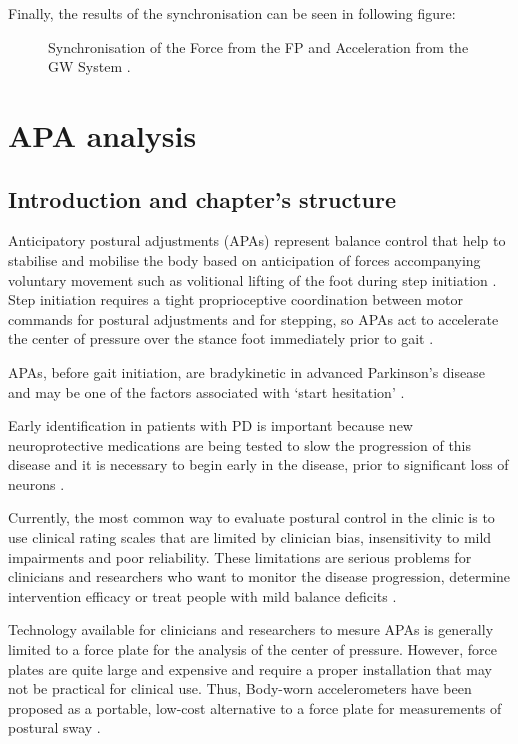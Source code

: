 Finally, the results of the synchronisation can be seen in following figure:

\begin{figure}[H]
	\centering
	\caption{Synchronisation of the Force from the FP and Acceleration from the GW System .}
	\label{fig:sinchronisedSignals}
\end{figure}


\section{APA analysis}
\subsection{Introduction and chapter's structure}

Anticipatory postural adjustments (APAs) represent balance control that help to stabilise and mobilise the body based on anticipation of forces accompanying voluntary movement such as volitional lifting of the foot during step initiation \cite{Mancini2010}. Step initiation requires a tight proprioceptive coordination between motor commands for postural adjustments and for stepping, so APAs act to accelerate the center of pressure over the stance foot immediately prior to gait \cite{Mancini2009}.

APAs, before gait initiation, are bradykinetic in advanced Parkinson’s disease and may be one of the factors associated with ‘start hesitation’ \cite{Mancini2009}.

Early identification in patients with PD is important because new neuroprotective medications are being tested to slow the progression of this disease and it is necessary to begin early in the disease, prior to significant loss of neurons \cite{Mancini2012}. 

Currently, the most common way to evaluate postural control in the clinic is to use clinical rating scales that are limited by clinician bias, insensitivity to mild impairments and poor reliability. These limitations are serious problems for clinicians and researchers who want to monitor the disease progression, determine intervention efficacy or treat people with mild balance deficits \cite{Mancini2012} .

Technology available for clinicians and researchers to mesure APAs is generally limited to a force plate for the analysis of the center of pressure. However, force plates are quite large and expensive and require a proper installation that may not be practical for clinical use. Thus, Body-worn accelerometers have been proposed as a portable, low-cost alternative to a force plate for measurements of postural sway \cite{Mancini2012} .
 
